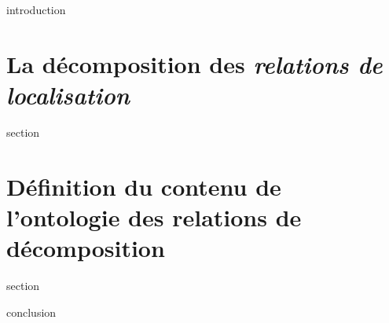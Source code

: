 \chaptertoc{}

\label{sec:5-int}
{introduction}

\section{La décomposition des \emph{relations de localisation}}
\label{sec:5-1}
{section}

\section{Définition du contenu de l'ontologie des relations de
  décomposition}
\label{sec:5-2}
{section}

\label{sec:5-cnc}
{conclusion}


